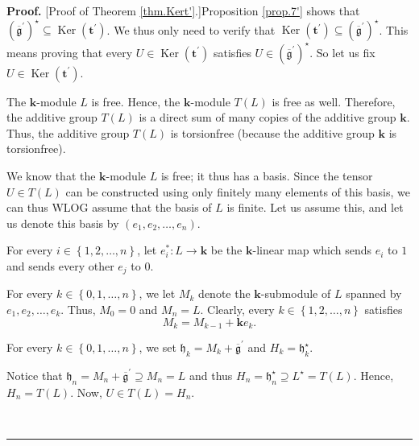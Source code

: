 \documentclass[numbers=enddot,12pt,final,onecolumn,notitlepage]{scrartcl}%
\theoremstyle{definition}
\newenvironment{proof}[1][Proof]{\noindent\textbf{#1.} }{\ \rule{0.5em}{0.5em}}
\begin{document}
\begin{proof}
[Proof of Theorem \ref{thm.Kert'}.]Proposition \ref{prop.7'} shows that
$\left(  \overline{\mathfrak{g}}^{\prime}\right)  ^{\star}\subseteq
\operatorname*{Ker}\left(  \mathbf{t}^{\prime}\right)  $. We thus only need to
verify that $\operatorname*{Ker}\left(  \mathbf{t}^{\prime}\right)
\subseteq\left(  \overline{\mathfrak{g}}^{\prime}\right)  ^{\star}$. This
means proving that every $U\in\operatorname*{Ker}\left(  \mathbf{t}^{\prime
}\right)  $ satisfies $U\in\left(  \overline{\mathfrak{g}}^{\prime}\right)
^{\star}$. So let us fix $U\in\operatorname*{Ker}\left(  \mathbf{t}^{\prime
}\right)  $.

The $\mathbf{k}$-module $L$ is free. Hence, the $\mathbf{k}$-module $T\left(
L\right)  $ is free as well. Therefore, the additive group $T\left(  L\right)
$ is a direct sum of many copies of the additive group $\mathbf{k}$. Thus, the
additive group $T\left(  L\right)  $ is torsionfree (because the additive
group $\mathbf{k}$ is torsionfree).

We know that the $\mathbf{k}$-module $L$ is free; it thus has a basis. Since
the tensor $U\in T\left(  L\right)  $ can be constructed using only finitely
many elements of this basis, we can thus WLOG assume that the basis of $L$ is
finite. Let us assume this, and let us denote this basis by $\left(
e_{1},e_{2},\ldots,e_{n}\right)  $.

For every $i\in\left\{  1,2,\ldots,n\right\}  $, let $e_{i}^{\ast
}:L\rightarrow\mathbf{k}$ be the $\mathbf{k}$-linear map which sends $e_{i}$
to $1$ and sends every other $e_{j}$ to $0$.

For every $k\in\left\{  0,1,\ldots,n\right\}  $, we let $M_{k}$ denote the
$\mathbf{k}$-submodule of $L$ spanned by $e_{1},e_{2},\ldots,e_{k}$. Thus,
$M_{0}=0$ and $M_{n}=L$. Clearly, every $k\in\left\{  1,2,\ldots,n\right\}  $
satisfies%
\begin{equation}
M_{k}=M_{k-1}+\mathbf{k}e_{k}. \label{pf.thm.Kert'.Mk}%
\end{equation}


For every $k\in\left\{  0,1,\ldots,n\right\}  $, we set $\mathfrak{h}%
_{k}=M_{k}+\overline{\mathfrak{g}}^{\prime}$ and $H_{k}=\mathfrak{h}%
_{k}^{\star}$.

Notice that $\mathfrak{h}_{n}=M_{n}+\overline{\mathfrak{g}}^{\prime}\supseteq
M_{n}=L$ and thus $H_{n}=\mathfrak{h}_{n}^{\star}\supseteq L^{\star}=T\left(
L\right)  $. Hence, $H_{n}=T\left(  L\right)  $. Now, $U\in T\left(  L\right)
=H_{n}$.


\end{proof}
\end{document}
